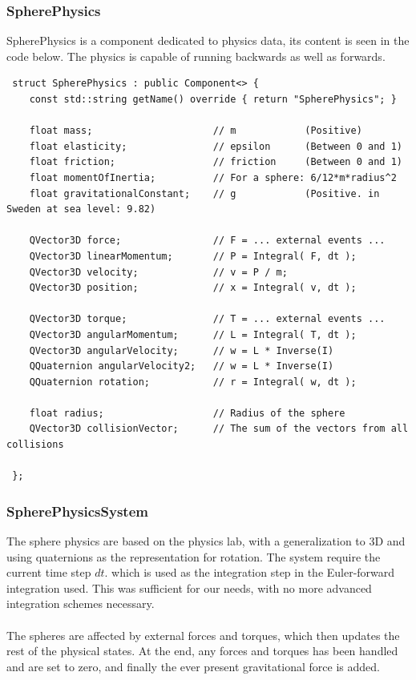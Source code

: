 \subsubsection{SpherePhysics}
SpherePhysics is a component dedicated to physics data, its content is seen in the code below. The physics is capable of running backwards as well as forwards.
\begin{lstlisting}
 struct SpherePhysics : public Component<> {
    const std::string getName() override { return "SpherePhysics"; }

    float mass;                     // m            (Positive)
    float elasticity;               // epsilon      (Between 0 and 1)
    float friction;                 // friction     (Between 0 and 1)
    float momentOfInertia;          // For a sphere: 6/12*m*radius^2
    float gravitationalConstant;    // g            (Positive. in Sweden at sea level: 9.82)

    QVector3D force;                // F = ... external events ...
    QVector3D linearMomentum;       // P = Integral( F, dt );
    QVector3D velocity;             // v = P / m;
    QVector3D position;             // x = Integral( v, dt );

    QVector3D torque;               // T = ... external events ...
    QVector3D angularMomentum;      // L = Integral( T, dt );
    QVector3D angularVelocity;      // w = L * Inverse(I)
    QQuaternion angularVelocity2;   // w = L * Inverse(I)
    QQuaternion rotation;           // r = Integral( w, dt );

    float radius;                   // Radius of the sphere
    QVector3D collisionVector;      // The sum of the vectors from all collisions

 };
\end{lstlisting}

\subsubsection{SpherePhysicsSystem}
The sphere physics are based on the physics lab, with a generalization to 3D and using quaternions as the representation for rotation. The system require the current time step $dt$. which is used as the integration step in the Euler-forward integration used. This was sufficient for our needs, with no more advanced integration schemes necessary.\\
\\
The spheres are affected by external forces and torques, which then updates the rest of the physical states. At the end, any forces and torques has been handled and are set to zero, and finally the ever present gravitational force is added.

